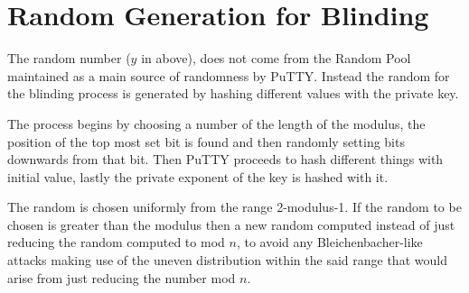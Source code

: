 \documentclass{report}
\begin{document}
\section{Random Generation for Blinding}
The random number (\(y\) in above), does not come from the Random Pool maintained as a main source of randomness by PuTTY. Instead the random for the blinding process is generated by hashing different values with the private key.\par
The process begins by choosing a number of the length of the modulus, the position of the top most set bit is found and then randomly setting bits downwards from that bit. Then PuTTY proceeds to hash different things with initial value, lastly the private exponent of the key is hashed with it.\par
The random is chosen uniformly from the range 2-modulus-1. If the random to be chosen is greater than the modulus then a new random computed instead of just reducing the random computed to mod \(n\), to avoid any Bleichenbacher-like attacks making use of the uneven distribution within the said range that would arise from just reducing the number mod \(n\).
\end{document}
